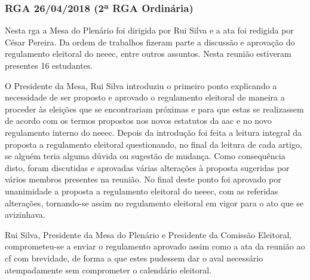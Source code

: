 
\subsubsection{RGA 26/04/2018 (2ª RGA Ordinária)}

Nesta \acrshort{rga} a Mesa do Plenário foi dirigida por Rui Silva e a ata foi redigida por César Pereira. Da ordem de trabalhos fizeram parte a discussão e aprovação do regulamento eleitoral do \acrshort{neeec}, entre outros assuntos. Nesta reunião estiveram presentes 16 estudantes.

O Presidente da Mesa, Rui Silva introduziu o primeiro ponto explicando a necessidade de ser proposto e aprovado o regulamento eleitoral de maneira a proceder às eleições que se encontrariam próximas e para que estas se realizassem de acordo com os termos propostos nos novos estatutos da aac e no novo regulamento interno do \acrshort{neeec}. Depois da introdução foi feita a leitura integral da proposta a regulamento eleitoral questionando, no final da leitura de cada artigo, se alguém teria alguma dúvida ou sugestão de mudança. Como consequência disto, foram discutidas e aprovadas várias alterações à proposta sugeridas por vários membros presentes na reunião. No final deste ponto foi aprovado por unanimidade a proposta a regulamento eleitoral do \acrshort{neeec}, com as referidas alterações, tornando-se assim no regulamento eleitoral em vigor para o ato que se avizinhava.

Rui Silva, Presidente da Mesa do Plenário e Presidente da Comissão Eleitoral, comprometeu-se a enviar o regulamento aprovado assim como a ata da reunião ao \acrfull{cf} com brevidade, de forma a que estes pudessem dar o aval necessário atempadamente sem comprometer o calendário eleitoral.